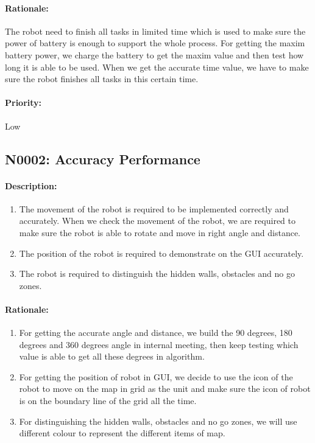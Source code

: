 \documentclass[11pt, a4paper]{report}
\begin{document}
\paragraph{Rationale:}
The robot need to finish all tasks in limited time which is used to make sure the power of battery is enough to support the whole process. For getting the maxim battery power, we charge the battery to get the maxim value and then test how long it is able to be used. When we get the accurate time value, we have to make sure the robot finishes all tasks in this certain time.   

\paragraph{Priority:}
Low

\subsection{N0002: Accuracy Performance}
\paragraph{Description:}
\begin{enumerate}
\item The movement of the robot is required to be implemented correctly and accurately. When we check the movement of the robot, we are required to make sure the robot is able to rotate and move in right angle and distance.
\item The position of the robot is required to demonstrate on the GUI accurately.
\item The robot is required to distinguish the hidden walls, obstacles and no go zones.
  \end{enumerate}
\paragraph{Rationale:}
\begin{enumerate}
\item For getting the accurate angle and distance, we build the 90 degrees, 180 degrees and 360 degrees angle in internal meeting, then keep testing which value is able to get all these degrees in algorithm.
\item For getting the position of robot in GUI, we decide to use the icon of the robot to move on the map in grid as the unit and make sure the icon of robot is on the boundary line of the grid all the time.
\item For distinguishing the hidden walls, obstacles and no go zones, we will use different colour to represent the different items of map. 
\end{enumerate}
\end{document}
